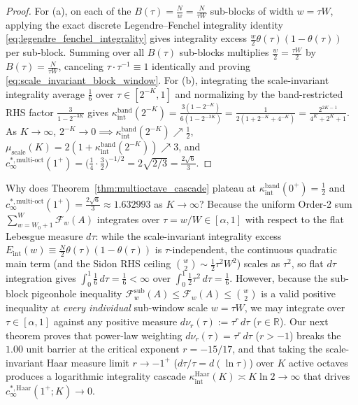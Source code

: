 \documentclass[11pt,reqno]{amsart}
\theoremstyle{definition}
\theoremstyle{remark}
\begin{document}
\begin{proof}
For (a), on each of the $B(\tau) = \frac{N}{w} = \frac{N}{\tau W}$ sub-blocks of width $w = \tau W$, applying the exact discrete Legendre--Fenchel integrality identity \eqref{eq:legendre_fenchel_integrality} gives integrality excess $\frac{w}{2}\theta(\tau)(1 - \theta(\tau))$ per sub-block. Summing over all $B(\tau)$ sub-blocks multiplies $\frac{w}{2} = \frac{\tau W}{2}$ by $B(\tau) = \frac{N}{\tau W}$, canceling $\tau \cdot \tau^{-1} \equiv 1$ identically and proving \eqref{eq:scale_invariant_block_window}. For (b), integrating the scale-invariant integrality average $\frac{1}{6}$ over $\tau \in [2^{-K}, 1]$ and normalizing by the band-restricted RHS factor $\frac{3}{1 - 2^{-3K}}$ gives $\kappa_{\mathrm{int}}^{\mathrm{band}}(2^{-K}) = \frac{3(1 - 2^{-K})}{6(1 - 2^{-3K})} = \frac{1}{2(1 + 2^{-K} + 4^{-K})} = \frac{2^{2K-1}}{4^K + 2^K + 1}$. As $K \to \infty$, $2^{-K} \to 0 \implies \kappa_{\mathrm{int}}^{\mathrm{band}}(2^{-K}) \nearrow \frac{1}{2}$, $\mu_{\mathrm{scale}}(K) = 2(1 + \kappa_{\mathrm{int}}^{\mathrm{band}}(2^{-K})) \nearrow 3$, and $c_\infty^{*,\mathrm{multi\text{-}oct}}(1^+) = \bigl(\frac{1}{4}\cdot\frac{3}{2}\bigr)^{-1/2} = 2\sqrt{2/3} = \frac{2\sqrt{6}}{3}$.
\end{proof}

Why does Theorem~\ref{thm:multioctave_cascade} plateau at $\kappa_{\mathrm{int}}^{\mathrm{band}}(0^+) = \frac{1}{2}$ and $c_\infty^{*,\mathrm{multi\text{-}oct}}(1^+) = \frac{2\sqrt{6}}{3} \approx 1.632993$ as $K \to \infty$? Because the uniform Order-2 sum $\sum_{w=W_0+1}^W \mathcal{F}_w(A)$ integrates over $\tau = w/W \in [\alpha, 1]$ with respect to the flat Lebesgue measure $d\tau$: while the scale-invariant integrality excess $E_{\mathrm{int}}(w) \equiv \frac{N}{2}\theta(\tau)(1-\theta(\tau))$ is $\tau$-independent, the continuous quadratic main term (and the Sidon RHS ceiling $\binom{w}{2} \sim \frac{1}{2}\tau^2 W^2$) scales as $\tau^2$, so flat $d\tau$ integration gives $\int_0^1 \frac{1}{6}\,d\tau = \frac{1}{6} < \infty$ over $\int_0^1 \frac{1}{2}\tau^2\,d\tau = \frac{1}{6}$. However, because the sub-block pigeonhole inequality $\mathcal{F}_w^{\mathrm{sub}}(A) \le \mathcal{F}_w(A) \le \binom{w}{2}$ is a valid positive inequality at \emph{every individual} sub-window scale $w = \tau W$, we may integrate over $\tau \in [\alpha, 1]$ against any positive measure $d\nu_r(\tau) := \tau^r\,d\tau$ ($r \in \mathbb{R}$). Our next theorem proves that power-law weighting $d\nu_r(\tau) = \tau^r\,d\tau$ ($r > -1$) breaks the $1.00$ unit barrier at the critical exponent $r = -15/17$, and that taking the scale-invariant Haar measure limit $r \to -1^+$ ($d\tau/\tau = d(\ln \tau)$) over $K$ active octaves produces a logarithmic integrality cascade $\kappa_{\mathrm{int}}^{\mathrm{Haar}}(K) \asymp K \ln 2 \to \infty$ that drives $c_\infty^{*,\mathrm{Haar}}(1^+; K) \to 0$.
\end{document}
